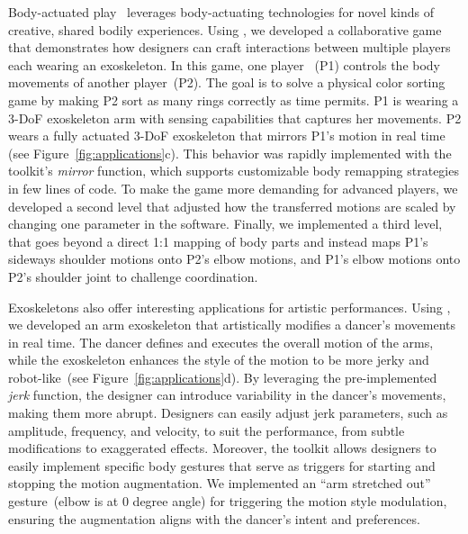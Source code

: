 Body-actuated play~\cite{patibanda_2022} leverages body-actuating technologies for novel kinds of creative, shared bodily experiences. Using \toolkit, we developed a collaborative game that demonstrates how designers can craft interactions between multiple players each wearing an exoskeleton. In this game, one player ~(P1) controls the body movements of another player~(P2). The  goal is to solve a physical color sorting game by making P2 sort as many rings correctly as time permits. 
P1 is wearing a 3-DoF exoskeleton arm with sensing capabilities that captures her movements. P2 wears a fully actuated 3-DoF exoskeleton that mirrors P1's motion in real time~
(see Figure~\ref{fig:applications}c). This behavior was rapidly implemented with the toolkit’s \textit{mirror} function, which supports customizable body remapping strategies in few lines of code. 
To make the game more demanding for advanced players, we developed a second level that adjusted how the transferred motions are scaled by changing one parameter in the software. Finally, we implemented a third level, that goes beyond a direct 1:1 mapping of body parts and instead maps P1's sideways shoulder motions onto P2's elbow motions, and P1's elbow motions onto P2's shoulder joint to challenge coordination. 

Exoskeletons also offer interesting applications for artistic performances. Using \toolkit, we developed an arm exoskeleton that artistically modifies a dancer’s movements in real time. The dancer defines and executes the overall motion of the arms, while the exoskeleton enhances the style of the motion to be more jerky and robot-like~(see Figure~\ref{fig:applications}d).
By leveraging the pre-implemented \textit{jerk} function, the designer can introduce variability in the dancer’s movements, making them more abrupt. 
Designers can easily adjust jerk parameters, such as amplitude, frequency, and velocity, to suit the performance, from subtle modifications to exaggerated effects. 
Moreover, the toolkit allows designers to easily implement specific body gestures that serve as triggers for starting and stopping the motion augmentation. We implemented an ``arm stretched out'' gesture~(elbow is at 0 degree angle) for triggering the motion style modulation, ensuring the augmentation aligns with the dancer's intent and preferences.



